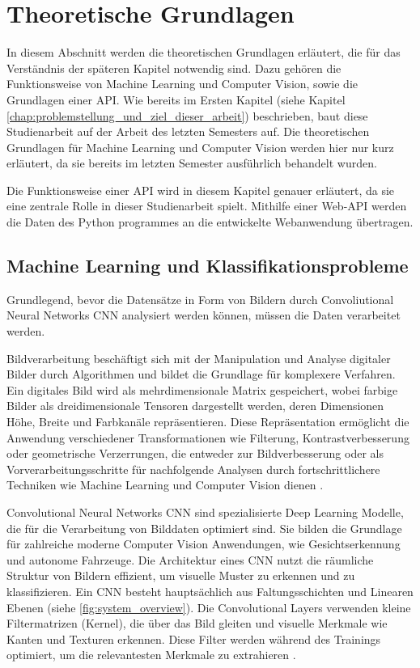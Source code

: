 \chapter{Theoretische Grundlagen} \label{chap:theoretische_grundlagen}  %
In diesem Abschnitt werden die theoretischen Grundlagen erläutert, die für das Verständnis der späteren Kapitel notwendig sind. Dazu gehören die Funktionsweise von Machine Learning und Computer Vision, sowie die Grundlagen einer API.
Wie bereits im Ersten Kapitel (siehe Kapitel \ref{chap:problemstellung_und_ziel_dieser_arbeit}) beschrieben, baut diese Studienarbeit auf der Arbeit des letzten Semesters auf. 
Die theoretischen Grundlagen für Machine Learning und Computer Vision werden hier nur kurz erläutert, da sie bereits im letzten Semester ausführlich behandelt wurden.

Die Funktionsweise einer API wird in diesem Kapitel genauer erläutert, da sie eine zentrale Rolle in dieser Studienarbeit spielt. Mithilfe einer Web-API werden die Daten
des Python programmes an die entwickelte Webanwendung übertragen.

\section{Machine Learning und Klassifikationsprobleme} \label{sec:ml_cv}  %
Grundlegend, bevor die Datensätze in Form von Bildern durch Convoliutional Neural Networks \ac{CNN} analysiert werden können, müssen die Daten verarbeitet werden.

Bildverarbeitung beschäftigt sich mit der Manipulation und Analyse digitaler Bilder durch Algorithmen und bildet die Grundlage für komplexere Verfahren. 
Ein digitales Bild wird als mehrdimensionale Matrix gespeichert, wobei farbige Bilder als dreidimensionale Tensoren 
dargestellt werden, deren Dimensionen Höhe, Breite und Farbkanäle repräsentieren. 
Diese Repräsentation ermöglicht die Anwendung verschiedener Transformationen wie Filterung, Kontrastverbesserung oder geometrische Verzerrungen, die 
entweder zur Bildverbesserung oder als Vorverarbeitungsschritte für nachfolgende Analysen durch fortschrittlichere Techniken wie Machine Learning und Computer Vision dienen \cite{finbridgede_computer_2022}.

Convolutional Neural Networks \ac{CNN} sind spezialisierte Deep Learning Modelle, die für die Verarbeitung von Bilddaten optimiert sind. Sie bilden die Grundlage für zahlreiche moderne Computer Vision Anwendungen, wie Gesichtserkennung und autonome Fahrzeuge. 
Die Architektur eines CNN nutzt die räumliche Struktur von Bildern effizient, um visuelle Muster zu erkennen und zu klassifizieren.
Ein CNN besteht hauptsächlich aus Faltungsschichten und Linearen Ebenen (siehe \autoref{fig:system_overview}). 
Die Convolutional Layers verwenden kleine Filtermatrizen (Kernel), die über das Bild gleiten und visuelle Merkmale wie Kanten und Texturen erkennen. 
Diese Filter werden während des Trainings optimiert, um die relevantesten Merkmale zu extrahieren \cite{finbridgede_computer_2022} \cite{intel_convolutional_nodate}.

